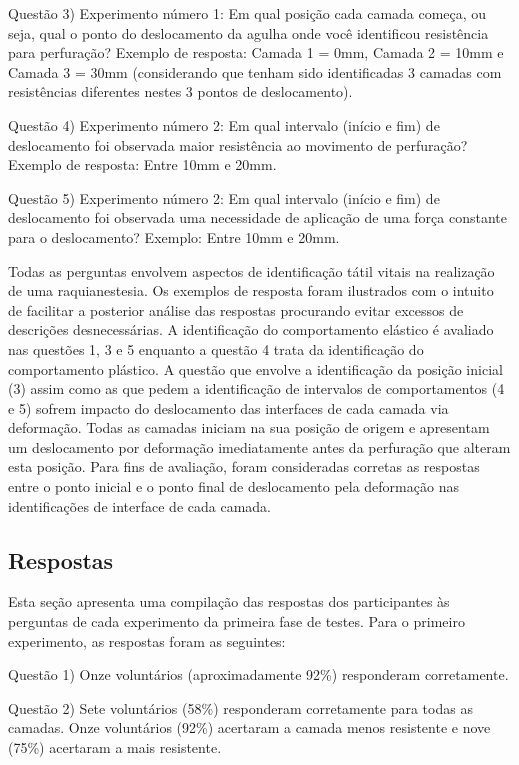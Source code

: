 Questão 3) Experimento número 1: Em qual posição cada camada começa, ou seja, qual o ponto do deslocamento da agulha onde você identificou resistência para perfuração? 
Exemplo de resposta: Camada 1 = 0mm, Camada 2 = 10mm e Camada 3 = 30mm (considerando que tenham sido identificadas 3 camadas com resistências diferentes nestes 3 pontos de deslocamento).

Questão 4) Experimento número 2: Em qual intervalo (início e fim) de deslocamento foi observada maior resistência ao movimento de perfuração? 
Exemplo de resposta: Entre 10mm e 20mm.

Questão 5) Experimento número 2: Em qual intervalo (início e fim) de deslocamento foi observada uma necessidade de aplicação de uma força constante para o deslocamento? 
Exemplo: Entre 10mm e 20mm.

Todas as perguntas envolvem aspectos de identificação tátil vitais na realização de uma raquianestesia. Os exemplos de resposta foram ilustrados com o intuito de facilitar a posterior análise das respostas procurando evitar excessos de descrições desnecessárias. A identificação do comportamento elástico é avaliado nas questões 1, 3 e 5 enquanto a questão 4 trata da identificação do comportamento plástico. A questão que envolve a identificação da posição inicial (3) assim como as que pedem a identificação de intervalos de comportamentos (4 e 5) sofrem impacto do deslocamento das interfaces de cada camada via deformação. Todas as camadas iniciam na sua posição de origem e apresentam um deslocamento por deformação imediatamente antes da perfuração que alteram esta posição. Para fins de avaliação, foram consideradas corretas as respostas entre o ponto inicial e o ponto final de deslocamento pela deformação nas identificações de interface de cada camada.  

\subsection{Respostas}
\label{sec:respostas}

Esta seção apresenta uma compilação das respostas dos participantes às perguntas de cada experimento da primeira fase de testes. Para o primeiro experimento, as respostas foram as seguintes:

Questão 1) Onze voluntários (aproximadamente 92\%) responderam corretamente.

Questão 2) Sete voluntários (58\%) responderam corretamente para todas as camadas. Onze voluntários (92\%) acertaram a camada menos resistente e nove (75\%) acertaram a mais resistente.

